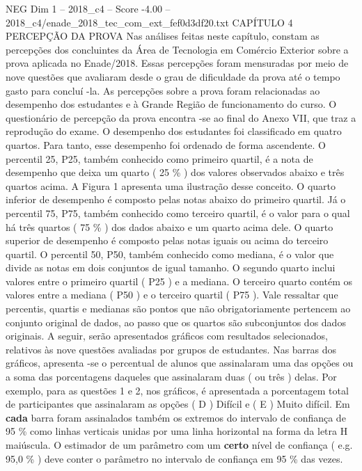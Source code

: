 \begin{textsample}{NEG Dim 1 – 2018\_c4 – Score -4.00 – 2018\_c4/enade\_2018\_tec\_com\_ext\_fef0d3df20.txt}  \label{ex:f1_neg_134}
CAPÍTULO 4 PERCEPÇÃO DA PROVA Nas análises feitas neste capítulo, constam as percepções dos concluintes da Área de Tecnologia em Comércio Exterior sobre a prova aplicada no Enade/2018.
Essas percepções foram mensuradas por meio de nove questões que avaliaram desde o grau de dificuldade da prova até o tempo gasto para concluí -la.
As percepções sobre a prova foram relacionadas ao desempenho dos estudantes e à Grande Região de funcionamento do curso.
O questionário de percepção da prova encontra -se ao final do Anexo VII, que traz a reprodução do exame.
O desempenho dos estudantes foi classificado em quatro quartos.
Para tanto, esse desempenho foi ordenado de forma ascendente.
O percentil 25, P25, também conhecido como primeiro quartil, é a nota de desempenho que deixa um quarto ( 25 \% ) dos valores observados abaixo e três quartos acima.
A Figura 1 apresenta uma ilustração desse conceito.
O quarto inferior de desempenho é composto pelas notas abaixo do primeiro quartil.
Já o percentil 75, P75, também conhecido como terceiro quartil, é o valor para o qual há três quartos ( 75 \% ) dos dados abaixo e um quarto acima dele.
O quarto superior de desempenho é composto pelas notas iguais ou acima do terceiro quartil.
O percentil 50, P50, também conhecido como mediana, é o valor que divide as notas em dois conjuntos de igual tamanho.
O segundo quarto inclui valores entre o primeiro quartil ( P25 ) e a mediana.
O terceiro quarto contém os valores entre a mediana ( P50 ) e o terceiro quartil ( P75 ).
Vale ressaltar que percentis, quartis e medianas são pontos que não obrigatoriamente pertencem ao conjunto original de dados, ao passo que os quartos são subconjuntos dos dados originais.
A seguir, serão apresentados gráficos com resultados selecionados, relativos às nove questões avaliadas por grupos de estudantes.
Nas barras dos gráficos, apresenta -se o percentual de alunos que assinalaram uma das opções ou a soma das porcentagens daqueles que assinalaram duas ( ou três ) delas.
Por exemplo, para as questões 1 e 2, nos gráficos, é apresentada a porcentagem total de participantes que assinalaram as opções ( D ) Difícil e ( E ) Muito difícil.
Em \textbf{cada} barra foram assinalados também os extremos do intervalo de confiança de 95 \% como linhas verticais unidas por uma linha horizontal na forma da letra H maiúscula.
O estimador de um parâmetro com um \textbf{certo} nível de confiança ( e.g. 95,0 \% ) deve conter o parâmetro no intervalo de confiança em 95 \% das vezes.

\end{textsample}
